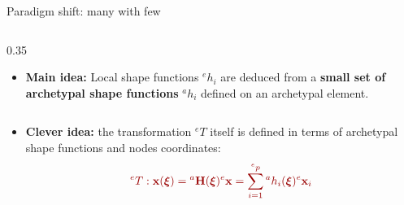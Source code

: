 \documentclass[aspectratio=169]{beamer}
\begin{document}
{\begin{frame}{Paradigm shift: many with few}
\begin{columns}
    \begin{column}{0.35\textwidth}
      \begin{itemize}
        \item[\HandRight] {\color{darkred}\textbf{Main idea:}} Local shape functions ${}^eh_i$ are deduced from a \textbf{small set of archetypal shape functions}  ${}^ah_i$ defined on an archetypal element.
      \end{itemize}
    \end{column}
  \end{columns}
  \begin{itemize}
    \item[\HandRight] {\color{darkred}\textbf{Clever idea:}} the transformation ${}^eT$ itself is defined in terms of archetypal shape functions and nodes coordinates:
          \vspace{-0.3cm}
          \[
            {\color{darkred}{}^eT : \mathbf x(\boldxi) = {}^a\mathbf H(\boldxi) ^e{} \mathbf x=\sum_{i=1}^{{}^ep}{}^a h_i(\boldxi){}^e\mathbf x_i       }
          \]
  \end{itemize}
\end{frame}


}
\end{document}
